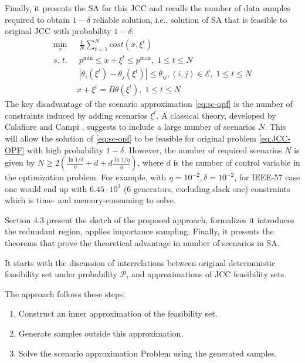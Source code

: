 Finally, it presents the SA for this JCC and recalls the number of data samples required to obtain $1-\delta$ reliable solution, i.e., solution of SA that is feasible to original JCC with probability $1-\delta$:
\begin{align}\label{eq:sc-opf}
  \min_x & \; \frac{1}{N} \sum_{t=1}^N \textit{cost}(x,\xi^t)\\
  \textit{s. t. } & \; p^{\min} \le x+\xi^t \le p^{\max}, \; 1\le t \le N\nonumber\\
  & \; |\theta_i(\xi^t) - \theta_j(\xi^t)| \le {\bar \theta}_{ij}, (i, j)\in \mathcal{E}, \; 1\le t \le N\nonumber\\
  & x+\xi^t = B \theta(\xi^t), \; 1\le t \le N\nonumber
\end{align}
The key disadvantage of the scenario approximation \eqref{eq:sc-opf} is the number of constraints induced by adding scenarios $\xi^t$. A classical theory, developed by Calafiore and Campi \cite{calafiore2006scenario}, suggests to include a large number of scenarios $N$. This will allow the solution of \eqref{eq:sc-opf} to be feasible for original problem \eqref{eq:JCC-OPF} with high probability $1 - \delta$. However, the number of required scenarios $N$ is given by $N \geq 2 \left( \frac{\ln{1/\delta}}{\eta} + d + d\frac{\ln{1/\eta}}{\eta} \right)$, where $d$ is the number of control variable in the optimization problem. For example, with $\eta = 10^{-2}, \delta = 10^{-2}$, for  IEEE-57 case one would end up with $6.45 \cdot 10^3$ (6 generators, excluding slack one) constraints which is time- and memory-consuming to solve.

Section 4.3 present the sketch of the proposed approach, formalizes it introduces the redundant region, applies importance sampling. Finally, it presents the theorems that prove the theoretical advantage in number of scenarios in SA.

It starts with the discussion of interrelations between original deterministic feasibility set under probability $\mathcal{P}$, and approximations of JCC feasibility sets. 

The approach follows these steps:

\begin{enumerate}
    \item Construct an inner approximation of the feasibility set.
    \item Generate samples outside this approximation.
    \item Solve the scenario approximation Problem using the generated samples.
\end{enumerate}


